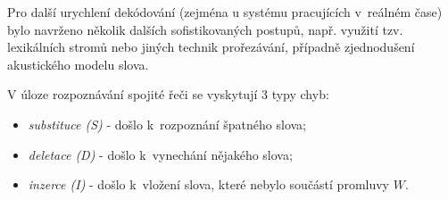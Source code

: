 
Pro další urychlení dekódování (zejména u systému pracujících v~reálném čase) bylo navrženo několik dalších sofistikovaných postupů, např. využití tzv. lexikálních stromů nebo jiných technik prořezávání, případně zjednodušení akustického modelu slova.




V úloze rozpoznávání spojité řeči se vyskytují 3 typy chyb:

\begin{itemize}
  \item \textit{substituce (S)} - došlo  k~rozpoznání špatného slova;
  \item \textit{deletace (D)} - došlo  k~vynechání nějakého slova;
  \item \textit{inzerce (I)} - došlo  k~vložení slova, které nebylo součástí promluvy $W$.
\end{itemize}

